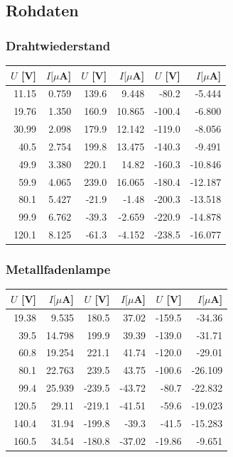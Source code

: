 \documentclass[12pt,a4paper]{article}
\begin{document}
\subsection*{Rohdaten}

\subsubsection*{Drahtwiederstand}
\begin{tabular}{|r|r|r|r|r|r|}
\hline
$U$ [V]&$I [\mu $A]&$U$ [V]&$I [\mu $A]&$U$ [V]&$I [\mu $A]\\
\hline
11.15&0.759&139.6&9.448&-80.2&-5.444\\
19.76&1.350&160.9&10.865&-100.4&-6.800\\
30.99&2.098&179.9&12.142&-119.0&-8.056\\
40.5&2.754&199.8&13.475&-140.3&-9.491\\
49.9&3.380&220.1&14.82&-160.3&-10.846\\
59.9&4.065&239.0&16.065&-180.4&-12.187\\
80.1&5.427&-21.9&-1.48&-200.3&-13.518\\
99.9&6.762&-39.3&-2.659&-220.9&-14.878\\
120.1&8.125&-61.3&-4.152&-238.5&-16.077\\
\hline
\end{tabular}

\subsubsection*{Metallfadenlampe}
\begin{tabular}{|r|r|r|r|r|r|}
\hline
$U$ [V]&$I [\mu $A]&$U$ [V]&$I [\mu $A]&$U$ [V]&$I [\mu $A]\\
\hline
19.38&9.535&180.5&37.02&-159.5&-34.36\\
39.5&14.798&199.9&39.39&-139.0&-31.71\\
60.8&19.254&221.1&41.74&-120.0&-29.01\\
80.1&22.763&239.5&43.75&-100.6&-26.109\\
99.4&25.939&-239.5&-43.72&-80.7&-22.832\\
120.5&29.11&-219.1&-41.51&-59.6&-19.023\\
140.4&31.94&-199.8&-39.3&-41.5&-15.283\\
160.5&34.54&-180.8&-37.02&-19.86&-9.651\\
\hline
\end{tabular}
\end{document}
